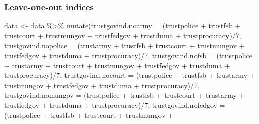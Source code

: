 \documentclass[
  letterpaper,
  DIV=11,
  numbers=noendperiod]{scrartcl}
\newenvironment{Shaded}{\begin{snugshade}}{\end{snugshade}}
\newcommand{\AttributeTok}[1]{\textcolor[rgb]{0.40,0.45,0.13}{#1}}
\newcommand{\DecValTok}[1]{\textcolor[rgb]{0.68,0.00,0.00}{#1}}
\newcommand{\FunctionTok}[1]{\textcolor[rgb]{0.28,0.35,0.67}{#1}}
\newcommand{\NormalTok}[1]{\textcolor[rgb]{0.00,0.23,0.31}{#1}}
\newcommand{\OtherTok}[1]{\textcolor[rgb]{0.00,0.23,0.31}{#1}}
\newcommand{\SpecialCharTok}[1]{\textcolor[rgb]{0.37,0.37,0.37}{#1}}
\begin{document}
\subsubsection{Leave-one-out indices}\label{leave-one-out-indices}

\begin{Shaded}
\begin{Highlighting}[]
\NormalTok{data }\OtherTok{\textless{}{-}}\NormalTok{ data }\SpecialCharTok{\%\textgreater{}\%} 
  \FunctionTok{mutate}\NormalTok{(}\AttributeTok{trustgovind.noarmy =}\NormalTok{ (trustpolice }\SpecialCharTok{+}\NormalTok{ trustfsb }\SpecialCharTok{+}\NormalTok{ trustcourt }\SpecialCharTok{+}\NormalTok{ trustmungov }\SpecialCharTok{+} 
\NormalTok{                                 trustfedgov }\SpecialCharTok{+}\NormalTok{ trustduma }\SpecialCharTok{+}\NormalTok{ trustprocuracy)}\SpecialCharTok{/}\DecValTok{7}\NormalTok{,}
         \AttributeTok{trustgovind.nopolice =}\NormalTok{ (trustarmy }\SpecialCharTok{+}\NormalTok{ trustfsb }\SpecialCharTok{+}\NormalTok{ trustcourt }\SpecialCharTok{+}\NormalTok{ trustmungov }\SpecialCharTok{+} 
\NormalTok{                                 trustfedgov }\SpecialCharTok{+}\NormalTok{ trustduma }\SpecialCharTok{+}\NormalTok{ trustprocuracy)}\SpecialCharTok{/}\DecValTok{7}\NormalTok{,}
         \AttributeTok{trustgovind.nofsb =}\NormalTok{ (trustpolice }\SpecialCharTok{+}\NormalTok{ trustarmy }\SpecialCharTok{+}\NormalTok{ trustcourt }\SpecialCharTok{+}\NormalTok{ trustmungov }\SpecialCharTok{+} 
\NormalTok{                                 trustfedgov }\SpecialCharTok{+}\NormalTok{ trustduma }\SpecialCharTok{+}\NormalTok{ trustprocuracy)}\SpecialCharTok{/}\DecValTok{7}\NormalTok{,}
         \AttributeTok{trustgovind.nocourt =}\NormalTok{ (trustpolice }\SpecialCharTok{+}\NormalTok{ trustfsb }\SpecialCharTok{+}\NormalTok{ trustarmy }\SpecialCharTok{+}\NormalTok{ trustmungov }\SpecialCharTok{+} 
\NormalTok{                                 trustfedgov }\SpecialCharTok{+}\NormalTok{ trustduma }\SpecialCharTok{+}\NormalTok{ trustprocuracy)}\SpecialCharTok{/}\DecValTok{7}\NormalTok{,}
         \AttributeTok{trustgovind.nomungov =}\NormalTok{ (trustpolice }\SpecialCharTok{+}\NormalTok{ trustfsb }\SpecialCharTok{+}\NormalTok{ trustcourt }\SpecialCharTok{+}\NormalTok{ trustarmy }\SpecialCharTok{+} 
\NormalTok{                                 trustfedgov }\SpecialCharTok{+}\NormalTok{ trustduma }\SpecialCharTok{+}\NormalTok{ trustprocuracy)}\SpecialCharTok{/}\DecValTok{7}\NormalTok{,}
         \AttributeTok{trustgovind.nofedgov =}\NormalTok{ (trustpolice }\SpecialCharTok{+}\NormalTok{ trustfsb }\SpecialCharTok{+}\NormalTok{ trustcourt }\SpecialCharTok{+}\NormalTok{ trustmungov }\SpecialCharTok{+} 

\end{Highlighting}
\end{Shaded}
\end{document}
